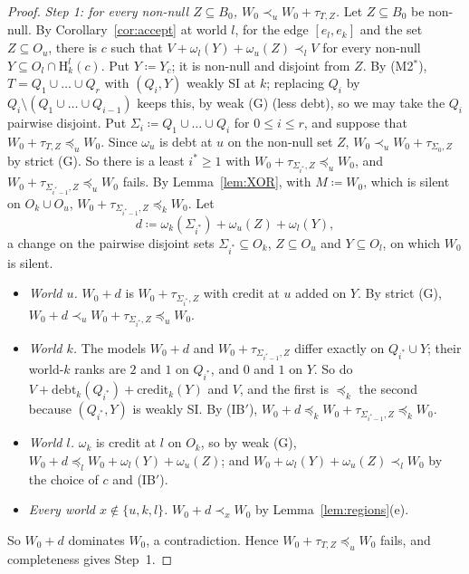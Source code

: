 \documentclass[11pt]{article}
\theoremstyle{definition}\newtheorem{definition}[theorem]{Definition}
\theoremstyle{remark}\newtheorem{remark}[theorem]{Remark}
\newcommand{\debt}{\mathrm{debt}}
\newcommand{\cred}{\mathrm{credit}}
\newcommand{\Hi}[3]{\mathrm H^{#1}_{#2}(#3)}
\begin{document}
\begin{proof}
\emph{Step 1: for every non-null $Z\subseteq B_0$,
$W_0\prec_uW_0+\tau_{T,Z}$.} Let $Z\subseteq B_0$ be non-null. By
Corollary~\ref{cor:accept} at world $l$, for the edge $[e_l,e_k]$ and the
set $Z\subseteq O_u$, there is $c$ such that
$V+\omega_l(Y)+\omega_u(Z)\prec_lV$ for every non-null $Y\subseteq O_l\cap\Hi
lkc$. Put $Y\coloneqq Y_c$; it is non-null and disjoint from $Z$. By
(M2$^*$), $T=Q_1\cup\dots\cup Q_r$ with $(Q_i,Y)$ weakly SI at $k$;
replacing $Q_i$ by $Q_i\setminus(Q_1\cup\dots\cup Q_{i-1})$ keeps this, by
weak (G) (less debt), so we may take the $Q_i$ pairwise disjoint. Put
$\Sigma_i\coloneqq Q_1\cup\dots\cup Q_i$ for $0\le i\le r$, and suppose
that $W_0+\tau_{T,Z}\preceq_uW_0$. Since $\omega_u$ is debt at $u$ on the
non-null set $Z$, $W_0\prec_uW_0+\tau_{\Sigma_0,Z}$ by strict (G). So there
is a least $i^*\ge1$ with $W_0+\tau_{\Sigma_{i^*},Z}\preceq_uW_0$, and
$W_0+\tau_{\Sigma_{i^*-1},Z}\preceq_uW_0$ fails. By Lemma~\ref{lem:XOR},
with $M\coloneqq W_0$, which is silent on $O_k\cup O_u$,
$W_0+\tau_{\Sigma_{i^*-1},Z}\preceq_kW_0$. Let
\[
 d\coloneqq\omega_k(\Sigma_{i^*})+\omega_u(Z)+\omega_l(Y),
\]
a change on the pairwise disjoint sets $\Sigma_{i^*}\subseteq O_k$,
$Z\subseteq O_u$ and $Y\subseteq O_l$, on which $W_0$ is silent.
\begin{itemize}[leftmargin=*,itemsep=2pt]
\item \emph{World $u$.} $W_0+d$ is $W_0+\tau_{\Sigma_{i^*},Z}$ with credit
at $u$ added on $Y$. By strict (G),
$W_0+d\prec_uW_0+\tau_{\Sigma_{i^*},Z}\preceq_uW_0$.
\item \emph{World $k$.} The models $W_0+d$ and
$W_0+\tau_{\Sigma_{i^*-1},Z}$ differ exactly on $Q_{i^*}\cup Y$; their
world-$k$ ranks are $2$ and $1$ on $Q_{i^*}$, and $0$ and $1$ on $Y$. So do
$V+\debt_k(Q_{i^*})+\cred_k(Y)$ and $V$, and the first is $\preceq_k$ the
second because $(Q_{i^*},Y)$ is weakly SI. By (IB$'$),
$W_0+d\preceq_kW_0+\tau_{\Sigma_{i^*-1},Z}\preceq_kW_0$.
\item \emph{World $l$.} $\omega_k$ is credit at $l$ on $O_k$, so by weak
(G), $W_0+d\preceq_lW_0+\omega_l(Y)+\omega_u(Z)$; and
$W_0+\omega_l(Y)+\omega_u(Z)\prec_lW_0$ by the choice of $c$ and (IB$'$).
\item \emph{Every world $x\notin\{u,k,l\}$.} $W_0+d\prec_xW_0$ by
Lemma~\ref{lem:regions}(e).
\end{itemize}
So $W_0+d$ dominates $W_0$, a contradiction. Hence
$W_0+\tau_{T,Z}\preceq_uW_0$ fails, and completeness gives Step~1.


\end{proof}
\end{document}
